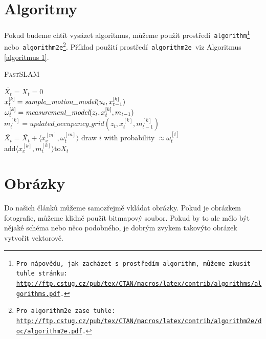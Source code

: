 \documentclass[a4paper, 11pt]{article}
\begin{document}
\section{Algoritmy}
\label{algoritmy}

Pokud budeme chtít vysázet algoritmus, můžeme použít prostředí\texttt{ algorithm\footnote{Pro nápovědu, jak zacházet s~prostředím\texttt{ algorithm, }můžeme zkusit tuhle stránku: \\ \url{http://ftp.cstug.cz/pub/tex/CTAN/macros/latex/contrib/algorithms/algorithms.pdf}.} }nebo\texttt{ algorithm2e\footnote{Pro\texttt{ algorithm2e }zase tuhle: \url{http://ftp.cstug.cz/pub/tex/CTAN/macros/latex/contrib/algorithm2e/doc/algorithm2e.pdf}.}}.
Příklad použití prostředí\texttt{ algorithm2e }viz Algoritmus \ref{algoritmus 1}. \\

\IncMargin{1.5em}
\begin{algorithm} \caption{\textsc{FastSLAM}}
\label{algoritmus 1}

\SetNlSty{}{}{:}
\SetNlSkip{0.4em}
\SetInd{1em}{1em}
\Indm
\Indmm
{}
\Indp
\Indpp
\BlankLine
$\overline{X_t}=X_t=0$\\
{$x_t^{[k]}=\emph{sample\_motion\_model}(u_t,x_{t-1}^{[k]})$\\
$\omega_t^{[k]}=\emph{measurement\_model}(z_t,x_t^{[k]},m_{t-1})$\\
$m_t^{[k]}=updated\_occupancy\_grid(z_t,x_t^{[k]},m_{t-1}^{[k]})$\\
$\overline{X_t}=\overline{X_t}+\langle x_x^{[m]},\omega_t^{[m]}\rangle $}
{draw $i$ with probability $\approx\omega_t^{[i]}$\\
add$\langle x_x^{[k]},m_t^{[k]}\rangle\textrm{to}X_t$\\}
\end{algorithm}
\DecMargin{1em}
	
\section{Obrázky}

Do našich článků můžeme samozřejmě vkládat obrázky. Pokud je obrázkem fotografie, můžeme klidně použít bitmapový soubor. Pokud by to ale mělo být nějaké schéma nebo něco podobného, je dobrým zvykem takovýto obrázek vytvořit vektorově.
\end{document}
